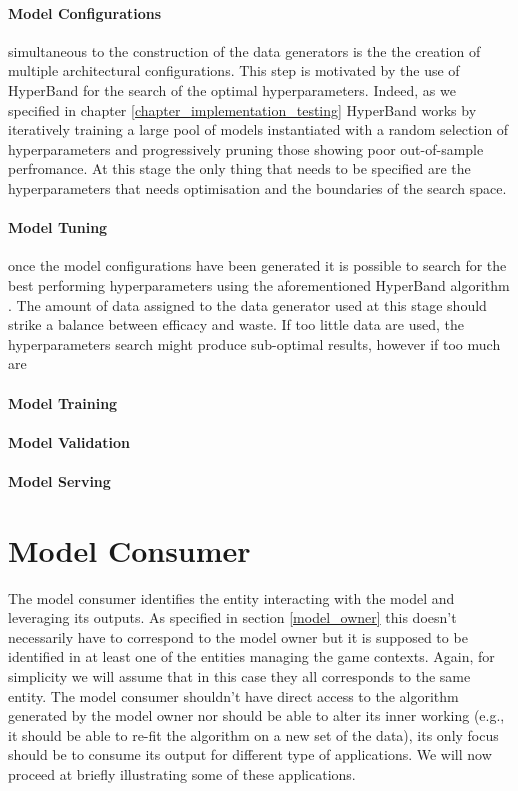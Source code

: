 \paragraph*{Model Configurations} simultaneous to the construction of the data generators is the the creation of multiple architectural configurations. This step is motivated by the use of HyperBand \cite{li2017hyperband} for the search of the optimal hyperparameters. Indeed, as we specified in chapter \ref{chapter_implementation_testing} HyperBand works by iteratively training a large pool of models instantiated with a random selection of hyperparameters and progressively pruning those showing poor out-of-sample perfromance. At this stage the only thing that needs to be specified are the hyperparameters that needs optimisation and the boundaries of the search space.

\paragraph*{Model Tuning} once the model configurations have been generated it is possible to search for the best performing hyperparameters using the aforementioned HyperBand algorithm \cite{li2017hyperband}. The amount of data assigned to the data generator used at this stage should strike a balance between efficacy and waste. If too little data are used, the hyperparameters search might produce sub-optimal results, however if too much are 

\paragraph*{Model Training} \lorem
\paragraph*{Model Validation} \lorem
\paragraph*{Model Serving} \lorem

\section{Model Consumer}
The model consumer identifies the entity interacting with the model and leveraging its outputs. As specified in section \ref{model_owner} this doesn't necessarily have to correspond to the model owner but it is supposed to be identified in at least one of the entities managing the game contexts. Again, for simplicity we will assume that in this case they all corresponds to the same entity. The model consumer shouldn't have direct access to the algorithm generated by the model owner nor should be able to alter its inner working (e.g., it should be able to re-fit the algorithm on a new set of the data), its only focus should be to consume its output for different type of applications. We will now proceed at briefly illustrating some of these applications.


